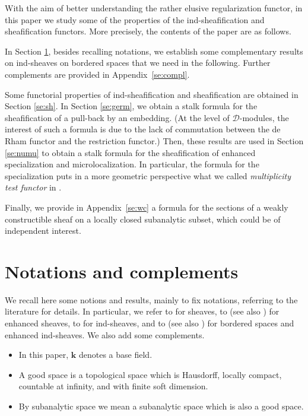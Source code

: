 \documentclass[11pt]{article}
\numberwithin{equation}{section}
\let\mathcal\mathscr
\theoremstyle{plain}
\theoremstyle{definition}
\newcommand{\sheaffont}[1]{\mathcal{#1}}
\newcommand{\D}{\sheaffont{D}}
\newcommand{\field}{\mathbf{k}}\let\cor\field
\begin{document}
With the aim of better understanding the rather elusive regularization functor,
in this paper we study some of the properties of the ind-sheafification and sheafification functors. More precisely, the contents of the paper are as follows.

In Section \ref{se:not}, besides recalling notations, we establish some complementary results on ind-sheaves on bordered spaces that we need in the following.
Further complements are provided in Appendix~\ref{se:compl}.

Some functorial properties of ind-sheafification and sheafification are obtained in Section \ref{se:sh}.
In Section \ref{se:germ}, we obtain a stalk formula for the sheafification of a pull-back by an embedding.
(At the level of $\D$-modules, the interest of such a formula is due to the lack of commutation between the de Rham functor and the restriction functor.)
Then, these results are used in Section \ref{se:numu} to obtain a stalk formula for the sheafification of enhanced specialization and microlocalization.
In particular, the formula for the specialization puts in a more geometric perspective what we called \emph{multiplicity test functor} in \cite[\S6.3]{DK18}.

Finally, we provide in Appendix~\ref{se:wc} a formula for the sections of a weakly constructible sheaf on a locally closed subanalytic subset, which could be of independent interest.

\section{Notations and complements}\label{se:not}
We recall here some notions and results, mainly to fix notations, referring to the literature for details. In particular, we refer to \cite{KS90} for sheaves, to \cite{Tam08} (see also \cite{GS14,DK19}) for enhanced sheaves, to \cite{KS01} for ind-sheaves, and to \cite{DK16} (see also \cite{KS16,Kas16,DK19}) for bordered spaces and enhanced ind-sheaves. We also add some complements.

\begin{itemize}
\item
In this paper, $\field$ denotes a base field.

\item
A good space is a topological space which is Hausdorff, locally compact, countable at infinity, and with finite soft dimension.

\item
By subanalytic space we mean a subanalytic space which is also a good space.
\end{itemize}
\end{document}
